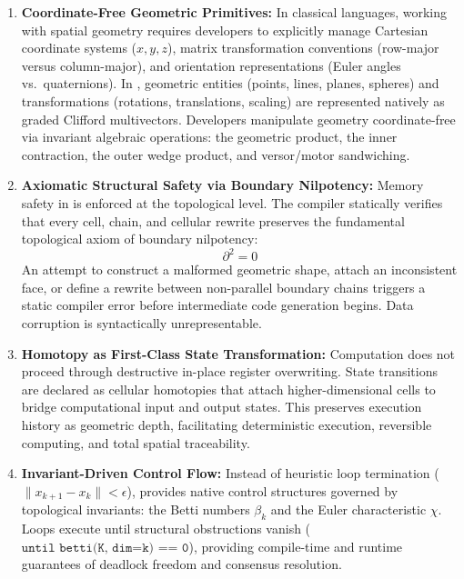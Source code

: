 \begin{enumerate}[leftmargin=1.2cm]
    \item \textbf{Coordinate-Free Geometric Primitives:}  
    In classical languages, working with spatial geometry requires developers to explicitly manage Cartesian coordinate systems ($x, y, z$), matrix transformation conventions (row-major versus column-major), and orientation representations (Euler angles vs.\ quaternions). In \ToposLang{}, geometric entities (points, lines, planes, spheres) and transformations (rotations, translations, scaling) are represented natively as graded Clifford multivectors. Developers manipulate geometry coordinate-free via invariant algebraic operations: the geometric product, the inner contraction, the outer wedge product, and versor/motor sandwiching.

    \item \textbf{Axiomatic Structural Safety via Boundary Nilpotency:}  
    Memory safety in \ToposLang{} is enforced at the topological level. The compiler statically verifies that every cell, chain, and cellular rewrite preserves the fundamental topological axiom of boundary nilpotency:
    \begin{equation}
        \partial^2 = 0
    \end{equation}
    An attempt to construct a malformed geometric shape, attach an inconsistent face, or define a rewrite between non-parallel boundary chains triggers a static compiler error before intermediate code generation begins. Data corruption is syntactically unrepresentable.

    \item \textbf{Homotopy as First-Class State Transformation:}  
    Computation does not proceed through destructive in-place register overwriting. State transitions are declared as cellular homotopies that attach higher-dimensional cells to bridge computational input and output states. This preserves execution history as geometric depth, facilitating deterministic execution, reversible computing, and total spatial traceability.

    \item \textbf{Invariant-Driven Control Flow:}  
    Instead of heuristic loop termination ($\|x_{k+1} - x_k\| < \epsilon$), \ToposLang{} provides native control structures governed by topological invariants: the Betti numbers $\beta_k$ and the Euler characteristic $\chi$. Loops execute until structural obstructions vanish ($\texttt{until betti(K, dim=k) == 0}$), providing compile-time and runtime guarantees of deadlock freedom and consensus resolution.
\end{enumerate}

